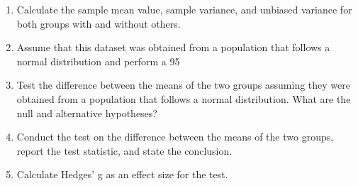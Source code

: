 \begin{enumerate}
	\item Calculate the sample mean value, sample variance, and unbiased variance for both groups with and without others.
	\item Assume that this dataset was obtained from a population that follows a normal distribution and perform a 95%
	\item Test the difference between the means of the two groups assuming they were obtained from a population that follows a normal distribution. What are the null and alternative hypotheses?
	\item Conduct the test on the difference between the means of the two groups, report the test statistic, and state the conclusion.
	\item Calculate Hedges' g as an effect size for the test.
\end{enumerate}
